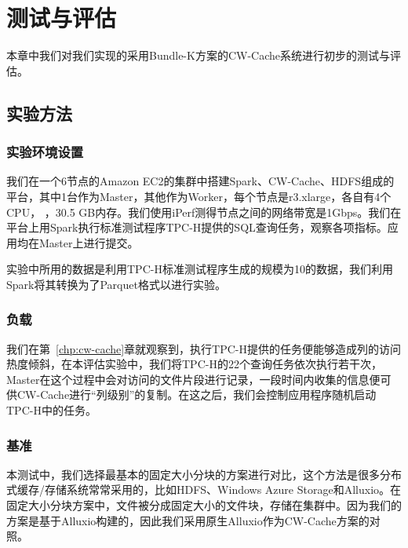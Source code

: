 \chapter{测试与评估}

\par 本章中我们对我们实现的采用Bundle-K方案的CW-Cache系统进行初步的测试与评估。

\section{实验方法}

\subsection{实验环境设置}

\par 我们在一个6节点的Amazon EC2的集群中搭建Spark、CW-Cache、HDFS组成的平台，其中1台作为Master，其他作为Worker，每个节点是r3.xlarge，各自有4个CPU， ，30.5 GB内存。我们使用iPerf测得节点之间的网络带宽是1Gbps。我们在平台上用Spark执行标准测试程序TPC-H提供的SQL查询任务，观察各项指标。应用均在Master上进行提交。

\par 实验中所用的数据是利用TPC-H标准测试程序生成的规模为10的数据，我们利用Spark将其转换为了Parquet格式以进行实验。

\subsection{负载}

\par 我们在第~\ref{chp:cw-cache}章就观察到，执行TPC-H提供的任务便能够造成列的访问热度倾斜，在本评估实验中，我们将TPC-H的22个查询任务依次执行若干次，Master在这个过程中会对访问的文件片段进行记录，一段时间内收集的信息便可供CW-Cache进行“列级别”的复制。在这之后，我们会控制应用程序随机启动TPC-H中的任务。

\subsection{基准}

\par 本测试中，我们选择最基本的固定大小分块的方案进行对比，这个方法是很多分布式缓存/存储系统常常采用的，比如HDFS、Windows Azure Storage和Alluxio。在固定大小分块方案中，文件被分成固定大小的文件块，存储在集群中。因为我们的方案是基于Alluxio构建的，因此我们采用原生Alluxio作为CW-Cache方案的对照。

